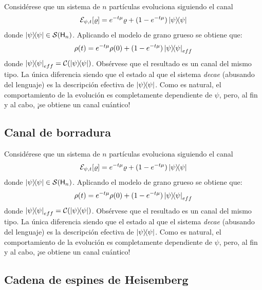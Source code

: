Considérese que un sistema de $n$ partículas evoluciona siguiendo el canal
\begin{equation*}
    \mcE_{\psi,t}[\varrho]=e^{-t\mu}\varrho+(1-e^{-t \mu})\dyad{\psi}
\end{equation*}
donde $\dyad{\psi}\in \densityspace{n}$. Aplicando el modelo de grano grueso se obtiene que:
\begin{equation*}
    \rho(t)=e^{-t\mu}\rho(0)+(1-e^{-t \mu})\dyad{\psi}_{eff}
\end{equation*}
donde $\dyad{\psi}_{eff}=\mcC(\dyad{\psi})$. Obsérvese que el resultado es un canal del mismo tipo. La única diferencia siendo que el estado al que el sistema \textit{decae} (abusando del lenguaje) es la descripción efectiva de $\dyad{\psi}$. Como es natural, el comportamiento de la evolución es completamente dependiente de $\psi$, pero, al fin y al cabo, ¡se obtiene un canal cuántico!

\subsection{Canal de borradura}

Considérese que un sistema de $n$ partículas evoluciona siguiendo el canal
\begin{equation*}
    \mcE_{\psi,t}[\varrho]=e^{-t\mu}\varrho+(1-e^{-t \mu})\dyad{\psi}
\end{equation*}
donde $\dyad{\psi}\in \densityspace{n}$. Aplicando el modelo de grano grueso se obtiene que:
\begin{equation*}
    \rho(t)=e^{-t\mu}\rho(0)+(1-e^{-t \mu})\dyad{\psi}_{eff}
\end{equation*}
donde $\dyad{\psi}_{eff}=\mcC(\dyad{\psi})$. Obsérvese que el resultado es un canal del mismo tipo. La única diferencia siendo que el estado al que el sistema \textit{decae} (abusando del lenguaje) es la descripción efectiva de $\dyad{\psi}$. Como es natural, el comportamiento de la evolución es completamente dependiente de $\psi$, pero, al fin y al cabo, ¡se obtiene un canal cuántico!


\subsection{Cadena de espines de Heisemberg}

